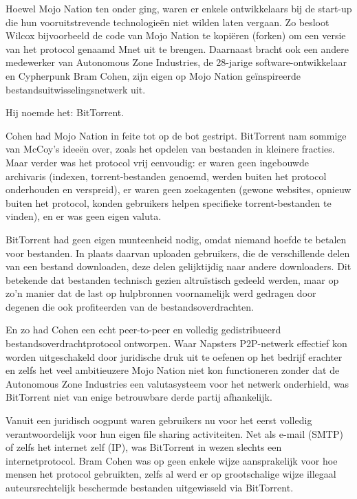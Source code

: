 \documentclass[
  a5paper,
  smalldemyvopaper,11pt,twoside,onecolumn,openright,extrafontsizes,
hidelinks]{memoir}
\begin{document}
Hoewel Mojo Nation ten onder ging, waren er enkele ontwikkelaars bij de
start-up die hun vooruitstrevende technologieën niet wilden laten
vergaan. Zo besloot Wilcox bijvoorbeeld de code van Mojo Nation te
kopiëren (forken) om een versie van het protocol genaamd Mnet uit te
brengen. Daarnaast bracht ook een andere medewerker van Autonomous Zone
Industries, de 28-jarige software-ontwikkelaar en Cypherpunk Bram Cohen,
zijn eigen op Mojo Nation geïnspireerde bestandsuitwisselingsnetwerk
uit.

Hij noemde het: BitTorrent.

Cohen had Mojo Nation in feite tot op de bot gestript. BitTorrent nam
sommige van McCoy's ideeën over, zoals het opdelen van bestanden in
kleinere fracties. Maar verder was het protocol vrij eenvoudig: er waren
geen ingebouwde archivaris (indexen, torrent-bestanden genoemd, werden
buiten het protocol onderhouden en verspreid), er waren geen zoekagenten
(gewone websites, opnieuw buiten het protocol, konden gebruikers helpen
specifieke torrent-bestanden te vinden), en er was geen eigen valuta.

BitTorrent had geen eigen munteenheid nodig, omdat niemand hoefde te
betalen voor bestanden. In plaats daarvan uploaden gebruikers, die de
verschillende delen van een bestand downloaden, deze delen gelijktijdig
naar andere downloaders. Dit betekende dat bestanden technisch gezien
altruïstisch gedeeld werden, maar op zo'n manier dat de last op
hulpbronnen voornamelijk werd gedragen door degenen die ook profiteerden
van de bestandsoverdrachten.

En zo had Cohen een echt peer-to-peer en volledig gedistribueerd
bestandsoverdrachtprotocol ontworpen. Waar Napsters P2P-netwerk
effectief kon worden uitgeschakeld door juridische druk uit te oefenen
op het bedrijf erachter en zelfs het veel ambitieuzere Mojo Nation niet
kon functioneren zonder dat de Autonomous Zone Industries een
valutasysteem voor het netwerk onderhield, was BitTorrent niet van enige
betrouwbare derde partij afhankelijk.

Vanuit een juridisch oogpunt waren gebruikers nu voor het eerst volledig
verantwoordelijk voor hun eigen file sharing activiteiten. Net als
e-mail (SMTP) of zelfs het internet zelf (IP), was BitTorrent in wezen
slechts een internetprotocol. Bram Cohen was op geen enkele wijze
aansprakelijk voor hoe mensen het protocol gebruikten, zelfs al werd er
op grootschalige wijze illegaal auteursrechtelijk beschermde bestanden
uitgewisseld via BitTorrent.
\end{document}

